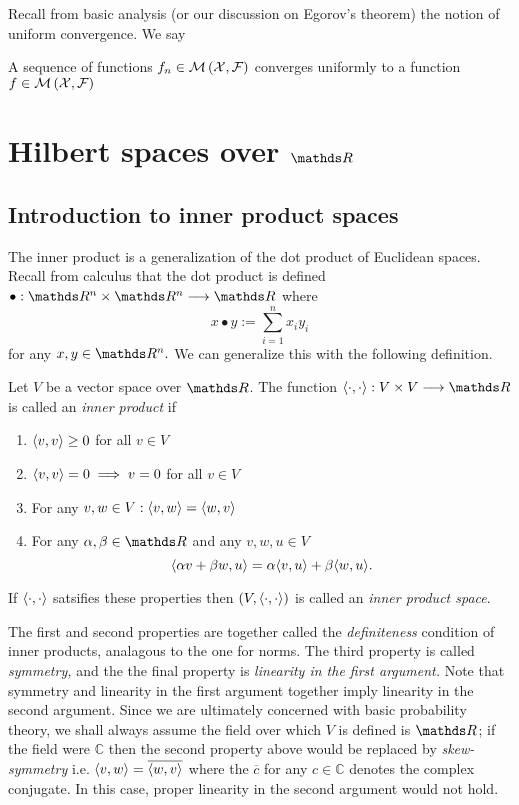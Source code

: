 Recall from basic analysis (or our discussion on Egorov's theorem)
the notion of uniform convergence. We say
\begin{defn}
\label{def:uniformConvergence}A sequence of functions $f_{n}\in\mathcal{M}\left(\mathcal{X},\mathcal{F}\right)$
converges uniformly to a function $f\in\mathcal{M}\left(\mathcal{X},\mathcal{F}\right)$
\end{defn}


\section{Hilbert spaces over $\protect\R$}

\subsection{Introduction to inner product spaces}

The inner product is a generalization of the dot product of Euclidean
spaces. Recall from calculus that the dot product is defined $\bullet:\R^{n}\times\R^{n}\longrightarrow\R$
where
\[
x\bullet y:=\sum_{i=1}^{n}x_{i}y_{i}
\]
for any $x,y\in\R^{n}.$ We can generalize this with the following
definition.
\begin{defn}
\label{def:innerProduct}Let $V$ be a vector space over $\R$. The
function $\innerproduct{\cdot}{\cdot}:V\times V\longrightarrow\R$
is called an\emph{ inner product }if

\begin{enumerate}[label=(\roman*),leftmargin=.1\linewidth,rightmargin=.4\linewidth]
	\item $\langle v,v\rangle \geq 0$ for all $ v \in V $
	\item $\langle v,v\rangle =0 \implies v = 0$ for all $ v \in V $
	\item For any $v,w \in V: \langle v,w\rangle = \langle w,v\rangle$
	\item For any $\alpha,\beta \in \R$ and any $v,w,u \in V$
	\[
			\langle\alpha v + \beta w,u\rangle = \alpha\langle v,u\rangle + \beta\langle w,u\rangle.
	\]
\end{enumerate}

If $\langle\cdot,\cdot\rangle$ satsifies these properties then
$\left(V,\langle\cdot,\cdot\rangle\right)$ is called an \emph{inner
product space}.
\end{defn}

The first and second properties are together called the \emph{definiteness
}condition of inner products, analagous to the one for norms. The
third property is called \emph{symmetry, }and the the final property
is \emph{linearity in the first argument.} Note that symmetry and
linearity in the first argument together imply linearity in the second
argument. Since we are ultimately concerned with basic probability
theory, we shall always assume the field over which $V$ is defined
is $\R$; if the field were $\mathds{C}$ then the second property
above would be replaced by \emph{skew-symmetry }i.e. $\langle v,w\rangle=\overline{\langle w,v\rangle}$
where the $\overline{c}$ for any $c\in\mathds{C}$ denotes the complex
conjugate. In this case, proper linearity in the second argument would
not hold.


